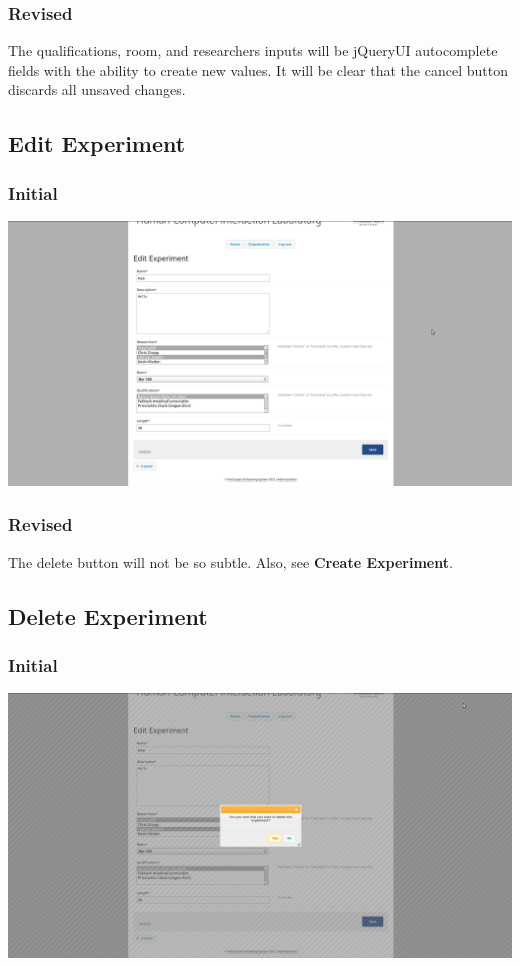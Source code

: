 \subsubsection{Revised}
The qualifications, room, and researchers inputs will be jQueryUI autocomplete fields with the ability to create new values. It will be clear that the cancel button discards all unsaved changes.

\subsection{Edit Experiment}
\subsubsection{Initial}
\includegraphics[width=6in]{../other/initial-interface-design/edit-experiment.png}
\subsubsection{Revised}
The delete button will not be so subtle. Also, see \textbf{Create Experiment}.

\subsection{Delete Experiment}
\subsubsection{Initial}
\includegraphics[width=6in]{../other/initial-interface-design/delete-experiment.png}
